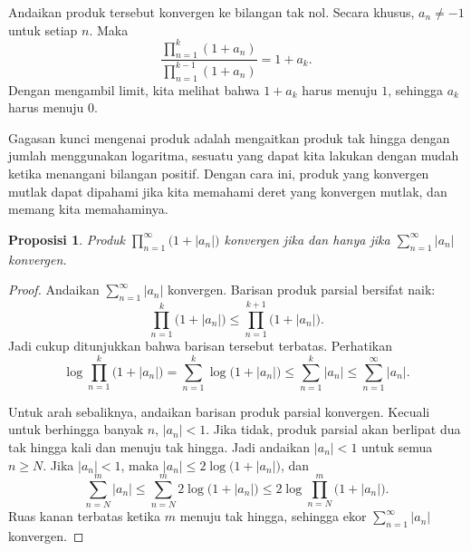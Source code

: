 \documentclass[12pt,openany]{book}
\newcommand{\sabs}[1]{\lvert {#1} \rvert}
\theoremstyle{plain}
\newtheorem{prop}[thm]{Proposisi}
\theoremstyle{remark}
\theoremstyle{definition}
\theoremstyle{exercise}
\theoremstyle{example}
\begin{document}
Andaikan produk tersebut konvergen ke bilangan tak nol.
Secara khusus, $a_n \neq -1$ untuk setiap $n$.  Maka
\begin{equation*}
\frac{
\prod_{n=1}^{k} (1+a_n)
}{
\prod_{n=1}^{k-1} (1+a_n)
}
=1+a_k .
\end{equation*}
Dengan mengambil limit, kita melihat bahwa $1+a_k$ harus menuju $1$,
sehingga $a_k$ harus menuju $0$.

Gagasan kunci mengenai produk adalah mengaitkan produk tak hingga dengan jumlah menggunakan
logaritma, sesuatu yang dapat kita lakukan dengan mudah ketika menangani bilangan
positif.
Dengan cara ini, produk yang konvergen mutlak dapat dipahami
jika kita memahami deret yang konvergen mutlak, dan memang kita memahaminya.

\begin{prop} \label{prop:infprodabsconvinfsum}
Produk $\prod_{n=1}^\infty \bigl(1+\sabs{a_n}\bigr)$ konvergen jika dan hanya jika
$\sum_{n=1}^\infty \sabs{a_n}$ konvergen.
\end{prop}

\begin{proof}
Andaikan $\sum_{n=1}^\infty \sabs{a_n}$ konvergen.
Barisan produk parsial bersifat naik:
\begin{equation*}
\prod_{n=1}^k \bigl(1+\sabs{a_n}\bigr) \leq
\prod_{n=1}^{k+1} \bigl(1+\sabs{a_n}\bigr) .
\end{equation*}
Jadi cukup ditunjukkan bahwa barisan tersebut terbatas.
Perhatikan
\begin{equation*}
\log \prod_{n=1}^k \bigl(1+\sabs{a_n}\bigr)
=
\sum_{n=1}^k \log \bigl(1+\sabs{a_n}\bigr)
\leq
\sum_{n=1}^k \sabs{a_n} \leq
\sum_{n=1}^\infty \sabs{a_n} .
\end{equation*}

Untuk arah sebaliknya, andaikan barisan produk parsial
konvergen.  Kecuali untuk berhingga banyak $n$, $\sabs{a_n} < 1$.
Jika tidak, produk parsial akan berlipat dua tak hingga kali dan menuju
tak hingga.  Jadi andaikan $\sabs{a_n} < 1$ untuk semua $n \geq N$.
Jika $\sabs{a_n} < 1$, maka $\sabs{a_n} \leq 2 \log \bigl(1+\sabs{a_n}\bigr)$,
dan
\begin{equation*}
\sum_{n=N}^m \sabs{a_n}
\leq
\sum_{n=N}^m 2 \log \bigl(1+\sabs{a_n}\bigr)
\leq
2 \log \prod_{n=N}^m \bigl(1+\sabs{a_n}\bigr) .
\end{equation*}
Ruas kanan terbatas ketika $m$ menuju tak hingga, sehingga ekor
$\sum_{n=1}^\infty \sabs{a_n}$ konvergen.
\end{proof}
\end{document}
